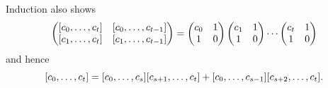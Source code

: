   Induction also shows
  \[
    \begin{pmatrix}
      \ExpansionOf{\Entry[0],\ldots,\Entry[\LastIndex]}
      &
        \ExpansionOf{\Entry[0],\ldots,\Entry[\LastIndex-1]}
      \\
      \ExpansionOf{\Entry[1],\ldots,\Entry[\LastIndex]}
      &
        \ExpansionOf{\Entry[1],\ldots,\Entry[\LastIndex-1]}
    \end{pmatrix}
    =
    \begin{pmatrix}
      \Entry[0] & 1 \\
      1 & 0
    \end{pmatrix}
    \begin{pmatrix}
      \Entry[1] & 1 \\
      1 & 0
    \end{pmatrix}
    \cdots
    \begin{pmatrix}
      \Entry[\LastIndex] & 1 \\
      1 & 0
    \end{pmatrix}
     \]
 and hence
  \[
    \ExpansionOf{\Entry[0],\ldots,\Entry[\LastIndex]}
    =
    \ExpansionOf{\Entry[0],\ldots,\Entry[\MidIndex]}
    \ExpansionOf{\Entry[\MidIndex+1],\ldots,\Entry[\LastIndex]}
    +
    \ExpansionOf{\Entry[0],\ldots,\Entry[\MidIndex-1]}
    \ExpansionOf{\Entry[\MidIndex+2],\ldots,\Entry[\LastIndex]}
    .
  \]

